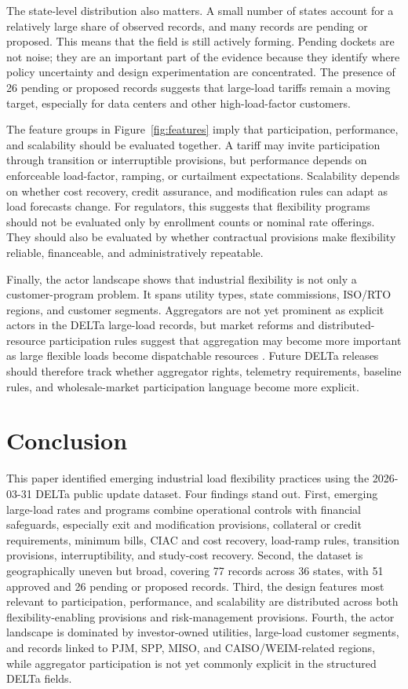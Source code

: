 \documentclass[11pt]{article}
\begin{document}
The state-level distribution also matters. A small number of states account for a relatively large share of observed records, and many records are pending or proposed. This means that the field is still actively forming. Pending dockets are not noise; they are an important part of the evidence because they identify where policy uncertainty and design experimentation are concentrated. The presence of 26 pending or proposed records suggests that large-load tariffs remain a moving target, especially for data centers and other high-load-factor customers.

The feature groups in Figure~\ref{fig:features} imply that participation, performance, and scalability should be evaluated together. A tariff may invite participation through transition or interruptible provisions, but performance depends on enforceable load-factor, ramping, or curtailment expectations. Scalability depends on whether cost recovery, credit assurance, and modification rules can adapt as load forecasts change. For regulators, this suggests that flexibility programs should not be evaluated only by enrollment counts or nominal rate offerings. They should also be evaluated by whether contractual provisions make flexibility reliable, financeable, and administratively repeatable.

Finally, the actor landscape shows that industrial flexibility is not only a customer-program problem. It spans utility types, state commissions, ISO/RTO regions, and customer segments. Aggregators are not yet prominent as explicit actors in the DELTa large-load records, but market reforms and distributed-resource participation rules suggest that aggregation may become more important as large flexible loads become dispatchable resources \cite{ml16,ferc2022}. Future DELTa releases should therefore track whether aggregator rights, telemetry requirements, baseline rules, and wholesale-market participation language become more explicit.

\section{Conclusion}
This paper identified emerging industrial load flexibility practices using the 2026-03-31 DELTa public update dataset. Four findings stand out. First, emerging large-load rates and programs combine operational controls with financial safeguards, especially exit and modification provisions, collateral or credit requirements, minimum bills, CIAC and cost recovery, load-ramp rules, transition provisions, interruptibility, and study-cost recovery. Second, the dataset is geographically uneven but broad, covering 77 records across 36 states, with 51 approved and 26 pending or proposed records. Third, the design features most relevant to participation, performance, and scalability are distributed across both flexibility-enabling provisions and risk-management provisions. Fourth, the actor landscape is dominated by investor-owned utilities, large-load customer segments, and records linked to PJM, SPP, MISO, and CAISO/WEIM-related regions, while aggregator participation is not yet commonly explicit in the structured DELTa fields.
\end{document}
